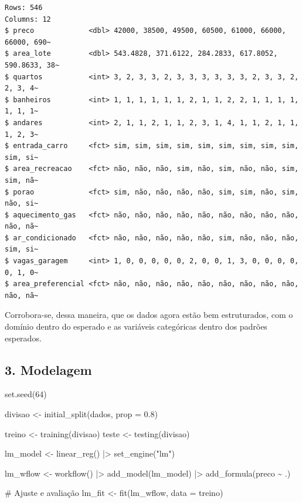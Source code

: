 \documentclass[
  letterpaper,
  DIV=11,
  numbers=noendperiod]{scrartcl}
\newenvironment{Shaded}{\begin{snugshade}}{\end{snugshade}}
\newcommand{\AttributeTok}[1]{\textcolor[rgb]{0.40,0.45,0.13}{#1}}
\newcommand{\CommentTok}[1]{\textcolor[rgb]{0.37,0.37,0.37}{#1}}
\newcommand{\DecValTok}[1]{\textcolor[rgb]{0.68,0.00,0.00}{#1}}
\newcommand{\FloatTok}[1]{\textcolor[rgb]{0.68,0.00,0.00}{#1}}
\newcommand{\FunctionTok}[1]{\textcolor[rgb]{0.28,0.35,0.67}{#1}}
\newcommand{\NormalTok}[1]{\textcolor[rgb]{0.00,0.23,0.31}{#1}}
\newcommand{\OtherTok}[1]{\textcolor[rgb]{0.00,0.23,0.31}{#1}}
\newcommand{\SpecialCharTok}[1]{\textcolor[rgb]{0.37,0.37,0.37}{#1}}
\newcommand{\StringTok}[1]{\textcolor[rgb]{0.13,0.47,0.30}{#1}}
\begin{document}
\begin{verbatim}
Rows: 546
Columns: 12
$ preco             <dbl> 42000, 38500, 49500, 60500, 61000, 66000, 66000, 690~
$ area_lote         <dbl> 543.4828, 371.6122, 284.2833, 617.8052, 590.8633, 38~
$ quartos           <int> 3, 2, 3, 3, 2, 3, 3, 3, 3, 3, 3, 2, 3, 3, 2, 2, 3, 4~
$ banheiros         <int> 1, 1, 1, 1, 1, 1, 2, 1, 1, 2, 2, 1, 1, 1, 1, 1, 1, 1~
$ andares           <int> 2, 1, 1, 2, 1, 1, 2, 3, 1, 4, 1, 1, 2, 1, 1, 1, 2, 3~
$ entrada_carro     <fct> sim, sim, sim, sim, sim, sim, sim, sim, sim, sim, si~
$ area_recreacao    <fct> não, não, não, sim, não, sim, não, não, sim, sim, nã~
$ porao             <fct> sim, não, não, não, não, sim, sim, não, sim, não, si~
$ aquecimento_gas   <fct> não, não, não, não, não, não, não, não, não, não, nã~
$ ar_condicionado   <fct> não, não, não, não, não, sim, não, não, não, sim, si~
$ vagas_garagem     <int> 1, 0, 0, 0, 0, 0, 2, 0, 0, 1, 3, 0, 0, 0, 0, 0, 1, 0~
$ area_preferencial <fct> não, não, não, não, não, não, não, não, não, não, nã~
\end{verbatim}

Corrobora-se, dessa maneira, que os dados agora estão bem estruturados,
com o domínio dentro do esperado e as variáveis categóricas dentro dos
padrões esperados.

\subsection{3. Modelagem}\label{modelagem}

\begin{Shaded}
\begin{Highlighting}[]
\FunctionTok{set.seed}\NormalTok{(}\DecValTok{64}\NormalTok{)}

\NormalTok{divisao }\OtherTok{\textless{}{-}} \FunctionTok{initial\_split}\NormalTok{(dados, }\AttributeTok{prop =} \FloatTok{0.8}\NormalTok{)}

\NormalTok{treino }\OtherTok{\textless{}{-}} \FunctionTok{training}\NormalTok{(divisao)}
\NormalTok{teste  }\OtherTok{\textless{}{-}} \FunctionTok{testing}\NormalTok{(divisao)}

\NormalTok{lm\_model }\OtherTok{\textless{}{-}} \FunctionTok{linear\_reg}\NormalTok{() }\SpecialCharTok{|\textgreater{}}
  \FunctionTok{set\_engine}\NormalTok{(}\StringTok{"lm"}\NormalTok{)}

\NormalTok{lm\_wflow }\OtherTok{\textless{}{-}} \FunctionTok{workflow}\NormalTok{() }\SpecialCharTok{|\textgreater{}}
  \FunctionTok{add\_model}\NormalTok{(lm\_model) }\SpecialCharTok{|\textgreater{}}
  \FunctionTok{add\_formula}\NormalTok{(preco }\SpecialCharTok{\textasciitilde{}}\NormalTok{ .)}

\CommentTok{\# Ajuste e avaliação}
\NormalTok{lm\_fit }\OtherTok{\textless{}{-}} \FunctionTok{fit}\NormalTok{(lm\_wflow, }\AttributeTok{data =}\NormalTok{ treino)}
\end{Highlighting}
\end{Shaded}
\end{document}
